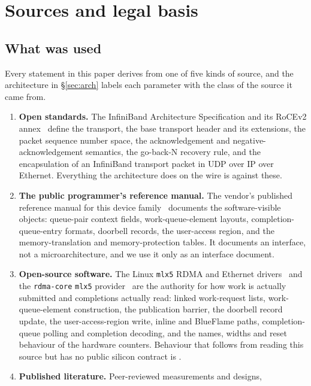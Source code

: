 \section{Sources and legal basis}
\label{sec:legal}

\subsection{What was used}

Every statement in this paper derives from one of five kinds of source, and the
architecture in \S\ref{sec:arch} labels each parameter with the class of the
source it came from.

\begin{enumerate}
  \item \textbf{Open standards.} The InfiniBand Architecture Specification and
    its RoCEv2 annex~\cite{ibta-vol1,ibta-a17} define the transport, the base
    transport header and its extensions, the packet sequence number space, the
    acknowledgement and negative-acknowledgement semantics, the go-back-N
    recovery rule, and the encapsulation of an InfiniBand transport packet in
    UDP over IP over Ethernet. Everything the architecture does on the wire is
    \evdoc{} against these.
  \item \textbf{The public programmer's reference manual.} The vendor's
    published reference manual for this device family~\cite{mlx-prm} documents
    the software-visible objects: queue-pair context fields, work-queue-element
    layouts, completion-queue-entry formats, doorbell records, the user-access
    region, and the memory-translation and memory-protection tables. It
    documents an interface, not a microarchitecture, and we use it only as an
    interface document.
  \item \textbf{Open-source software.} The Linux \texttt{mlx5} RDMA and
    Ethernet drivers~\cite{linux-mlx5} and the \texttt{rdma-core}
    \texttt{mlx5} provider~\cite{rdma-core} are the authority for how work is
    actually submitted and completions actually read: linked work-request
    lists, work-queue-element construction, the publication barrier, the
    doorbell record update, the user-access-region write, inline and BlueFlame
    paths, completion-queue polling and completion decoding, and the names,
    widths and reset behaviour of the hardware counters. Behaviour that follows
    from reading this source but has no public silicon contract is \evdrv{}.
  \item \textbf{Published literature.} Peer-reviewed measurements and designs,

\end{enumerate}

